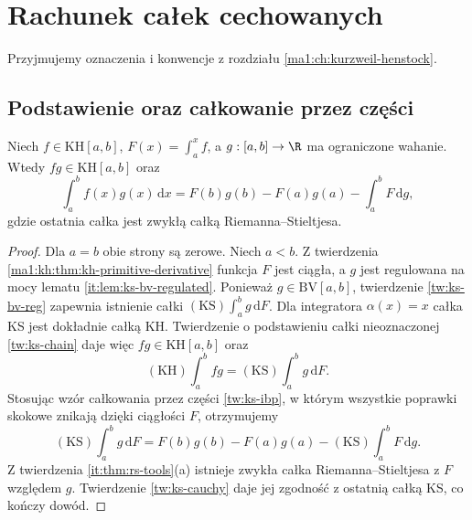 \chapter{Rachunek całek cechowanych}
\providecommand{\atlasref}[2]{#2}
\label{ma1:ch:rachunek-calek-cechowanych}
\begingroup
\providecommand{\osc}{\operatorname{osc}}
\providecommand{\Var}{\operatorname{Var}}
\providecommand{\mesh}{\operatorname{mesh}}
\providecommand{\supp}{\operatorname{supp}}
\providecommand{\AC}{\mathrm{AC}}
\providecommand{\BV}{\mathrm{BV}}
\providecommand{\HK}{\mathrm{KH}}
\providecommand{\ind}[1]{\chi_{#1}}
\providecommand{\Dn}{\underline D}
\providecommand{\Du}{\overline D}
\providecommand{\KS}{\mathrm{KS}}
Przyjmujemy oznaczenia i konwencje z rozdziału \ref{ma1:ch:kurzweil-henstock}.
\section{Podstawienie oraz całkowanie przez części}
\begin{twierdzenie}\label{ma1:kh:thm:bv-multiplier}
Niech $f\in\HK[a,b]$, $F(x)=\int_a^x f$, a $g:[a,b]\to\R$ ma ograniczone wahanie. Wtedy $fg\in\HK[a,b]$ oraz
\[
\int_a^b f(x)g(x)\,\mathrm dx=F(b)g(b)-F(a)g(a)-\int_a^b F\,\mathrm dg,
\]
gdzie ostatnia całka jest zwykłą całką Riemanna--Stieltjesa.
\end{twierdzenie}
\begin{proof}
Dla $a=b$ obie strony są zerowe. Niech $a<b$.
Z twierdzenia \ref{ma1:kh:thm:kh-primitive-derivative}
funkcja $F$ jest ciągła, a $g$ jest regulowana na mocy
lematu \ref{it:lem:ks-bv-regulated}. Ponieważ $g\in\BV[a,b]$,
twierdzenie \ref{tw:ks-bv-reg} zapewnia istnienie całki
$(\KS)\int_a^b g\,\mathrm dF$.
Dla integratora $\alpha(x)=x$ całka KS jest dokładnie
całką KH. Twierdzenie o podstawieniu całki nieoznaczonej
\ref{tw:ks-chain} daje więc $fg\in\HK[a,b]$ oraz
\[
 (\HK)\int_a^b fg=(\KS)\int_a^b g\,\mathrm dF.
\]
Stosując wzór całkowania przez części
\ref{tw:ks-ibp}, w którym wszystkie poprawki skokowe
znikają dzięki ciągłości $F$, otrzymujemy
\[
 (\KS)\int_a^b g\,\mathrm dF
 =F(b)g(b)-F(a)g(a)-(\KS)\int_a^b F\,\mathrm dg.
\]
Z twierdzenia \ref{it:thm:rs-tools}(a) istnieje
zwykła całka Riemanna--Stieltjesa z $F$ względem $g$.
Twierdzenie \ref{tw:ks-cauchy} daje jej zgodność
z ostatnią całką KS, co kończy dowód.
\end{proof}
